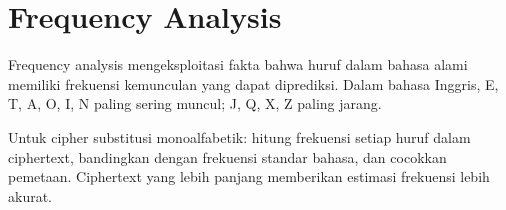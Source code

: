 \section{Frequency Analysis}

Frequency analysis mengeksploitasi fakta bahwa huruf dalam bahasa alami memiliki frekuensi kemunculan yang dapat diprediksi. Dalam bahasa Inggris, E, T, A, O, I, N paling sering muncul; J, Q, X, Z paling jarang.

Untuk cipher substitusi monoalfabetik: hitung frekuensi setiap huruf dalam ciphertext, bandingkan dengan frekuensi standar bahasa, dan cocokkan pemetaan. Ciphertext yang lebih panjang memberikan estimasi frekuensi lebih akurat.
